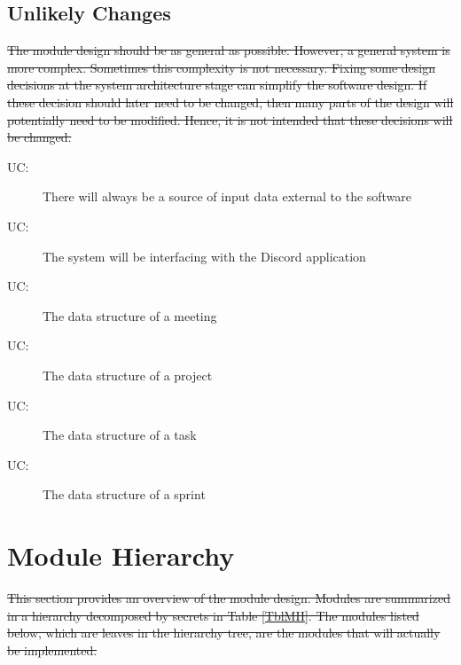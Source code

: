 \documentclass[12pt, titlepage]{article}
\newcounter{ucnum}
\newcommand{\uctheucnum}{UC\theucnum}
\begin{document}
\subsection{Unlikely Changes} \label{SecUchange}

\sout{The module design should be as general as possible. However, a general system is more complex. Sometimes this complexity is not necessary. Fixing some design decisions at the system architecture stage can simplify the software design. If these decision should later need to be changed, then many parts of the design will potentially need to be modified. Hence, it is not intended that these decisions will be changed.}

\begin{description}
\item[ \uctheucnum \label{ucInput}:] There will always be a source of input data external to the software
\item[ \uctheucnum \label{ucInput}:] The system will be interfacing with the Discord application
\item[ \uctheucnum \label{ucInput}:] The data structure of a meeting
\item[ \uctheucnum \label{ucInput}:] The data structure of a project
\item[ \uctheucnum \label{ucInput}:] The data structure of a task
\item[ \uctheucnum \label{ucInput}:] The data structure of a sprint
\end{description}

\section{Module Hierarchy} \label{SecMH}
\sout{This section provides an overview of the module design. Modules are summarized in a hierarchy decomposed by secrets in Table \ref{TblMH}. The modules listed below, which are leaves in the hierarchy tree, are the modules that will actually be implemented.}
\end{document}
